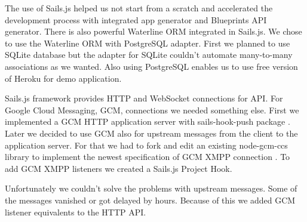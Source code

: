 The use of Sails.js helped us not start from a scratch and accelerated the development process with integrated app generator and Blueprints API generator. There is also powerful Waterline ORM integrated in Sails.js. We chose to use the Waterline ORM with PostgreSQL adapter. First we planned to use SQLite database but the adapter for SQLite couldn't automate many-to-many associations as we wanted. Also using PostgreSQL enables us to use free version of Heroku for demo application.

Sails.js framework provides HTTP and WebSocket connections for API. For Google Cloud Messaging, GCM, connections we needed something else. First we implemented a GCM HTTP application server with sails-hook-push package \cite{sails-hook}. Later we decided to use GCM also for upstream messages from the client to the application server. For that we had to fork and edit an existing node-gcm-ccs \cite{gcm-ccs} library to implement the newest specification of GCM XMPP connection \cite{gcm-xmpp}. To add GCM XMPP listeners we created a Sails.js Project Hook.

Unfortunately we couldn't solve the problems with upstream messages. Some of the messages vanished or got delayed by hours. Because of this we added GCM listener equivalents to the HTTP API.
